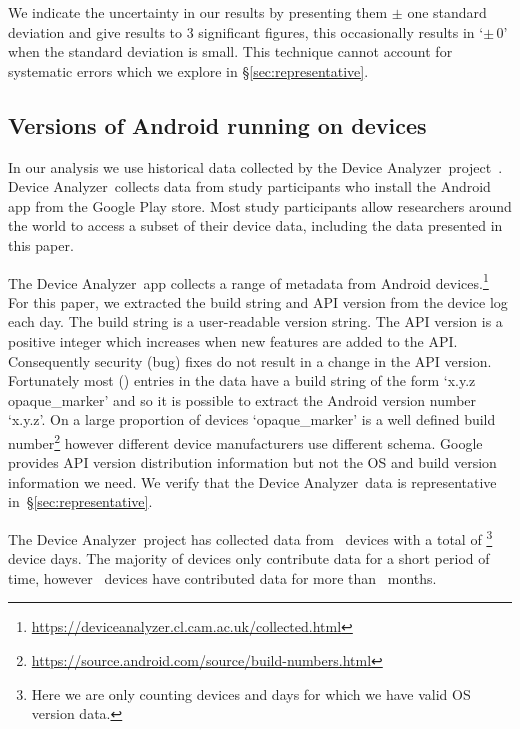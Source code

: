 \documentclass{llncs}
\let\OldTodo\todo
\renewcommand{\todo}{\OldTodo}%
\newcommand{\todolater}[1]{\todo{#1}}%
\newcommand{\da}{Device Analyzer}
\newcommand{\daNumDevices}{\daNumOSDevices}
\newcommand{\daDeviceDays}{\daOSTotalDaysData}
\begin{document}
We indicate the uncertainty in our results by presenting them $\pm$ one standard deviation and give results to 3 significant figures, this occasionally results in `$\pm\, 0$' when the standard deviation is small.
\todolater{Do we want to use the 95 percentile instead}
This technique cannot account for systematic errors which we explore in \S\ref{sec:representative}.

\subsection{Versions of Android running on devices}

In our analysis we use historical data collected by the \da\ project~\cite{Wagner2013}.
\da\ collects data from study participants who install the Android app from the Google Play store.
Most study participants allow researchers around the world to access a subset of their device data, including the data presented in this paper.

The \da\ app collects a range of metadata from Android devices.\footnote{\url{https://deviceanalyzer.cl.cam.ac.uk/collected.html}}
For this paper, we extracted the build string and API version from the device log each day.
The build string is a user-readable version string.
The API version is a positive integer which increases when new features are added to the API.
Consequently security (bug) fixes do not result in a change in the API version.
Fortunately most (\daOSVersionPercValidLines) entries in the data have a build string of the form `x.y.z opaque\_marker' and so it is possible to extract the Android version number `x.y.z'.
On a large proportion of devices `opaque\_marker' is a well defined build number\footnote{\url{https://source.android.com/source/build-numbers.html}} however different device manufacturers use different schema.
Google provides API version distribution information but not the OS and build version information we need. We verify that the \da\ data is representative in~\S\ref{sec:representative}.

The \da\ project has collected data from \daNumDevices\ devices with a total of \daDeviceDays\footnote{Here we are only counting devices and days for which we have valid OS version data.} device days.
The majority of devices only contribute data for a short period of time, however \daMonthsDevices\ devices have contributed data for more than \daMonths~months.
\end{document}
